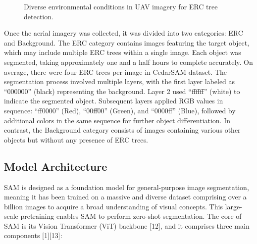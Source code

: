 \documentclass[letterpaper, 10 pt, conference]{ieeeconf}  %
\begin{document}
\begin{figure}[thpb]
  \centering
  \caption{Diverse environmental conditions in UAV imagery for ERC tree detection.}
  \label{fig:score_distributions}
\end{figure}

Once the aerial imagery was collected, it was divided into two categories: ERC and Background. The ERC category contains images featuring the target object, which may include multiple ERC trees within a single image. Each object was segmented, taking approximately one and a half hours to complete accurately. On average, there were four ERC trees per image in CedarSAM dataset. The segmentation process involved multiple layers, with the first layer labeled as ``000000'' (black) representing the background. Layer 2 used ``ffffff'' (white) to indicate the segmented object. Subsequent layers applied RGB values in sequence: ``ff0000'' (Red), ``00ff00'' (Green), and ``0000ff'' (Blue), followed by additional colors in the same sequence for further object differentiation. In contrast, the Background category consists of images containing various other objects but without any presence of ERC trees.

\subsection{Model Architecture}
SAM is designed as a foundation model for general-purpose image segmentation, meaning it has been trained on a massive and diverse dataset comprising over a billion images to acquire a broad understanding of visual concepts. This large-scale pretraining enables SAM to perform zero-shot segmentation. The core of SAM is its Vision Transformer (ViT) backbone [12], and it comprises three main components [1][13]:
\end{document}
